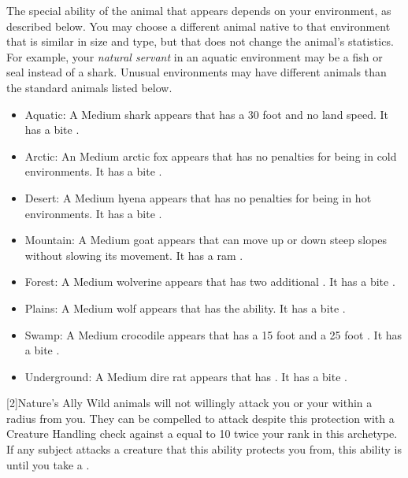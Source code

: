         The special ability of the animal that appears depends on your environment, as described below.
        You may choose a different animal native to that environment that is similar in size and type, but that does not change the animal's statistics.
        For example, your \textit{natural servant} in an aquatic environment may be a fish or seal instead of a shark.
        Unusual environments may have different animals than the standard animals listed below.
        \begin{itemize}
            \item Aquatic: A Medium shark appears that has a 30 foot  and no land speed.
                It has a bite .
            \item Arctic: An Medium arctic fox appears that has no penalties for being in cold environments.
                It has a bite .
            \item Desert: A Medium hyena appears that has no penalties for being in hot environments.
                It has a bite .
            \item Mountain: A Medium goat appears that can move up or down steep slopes without slowing its movement.
                It has a ram .
            \item Forest: A Medium wolverine appears that has two additional .
                It has a bite .
            \item Plains: A Medium wolf appears that has the  ability.
                It has a bite .
            \item Swamp: A Medium crocodile appears that has a 15 foot  and a 25 foot .
                It has a bite .
            \item Underground: A Medium dire rat appears that has .
                It has a bite .
        \end{itemize}

        [2]{Nature's Ally} Wild animals will not willingly attack you or your  within a \largearea radius  from you.
        They can be compelled to attack despite this protection with a Creature Handling check against a  equal to 10 \add twice your rank in this archetype.
        If any subject attacks a creature that this ability protects you from, this ability is  until you take a .

